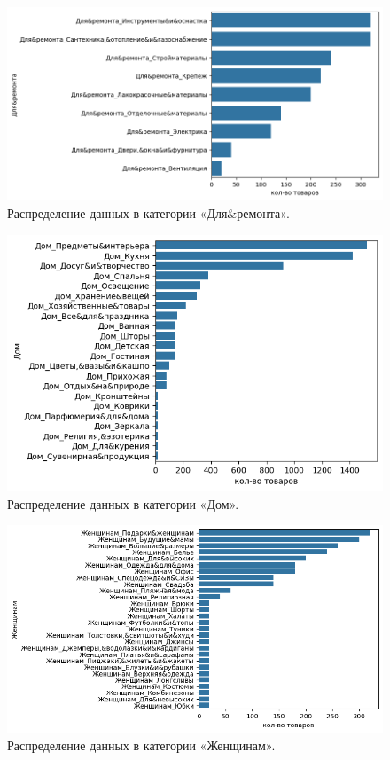 \documentclass[a4paper,12pt]{extarticle}
\begin{document}
\begin{figure}[hbtp]
	\centering
	\includegraphics[scale=0.8]{приложения/amount_of_category_Для&ремонта.png}
	\caption{Распределение данных в категории «Для\&ремонта».}
	\label{fig:amount_of_category_Для&ремонта}
\end{figure}

\begin{figure}[hbtp]
	\centering
	\includegraphics[scale=0.8]{приложения/amount_of_category_Дом.png}
	\caption{Распределение данных в категории «Дом».}
	\label{fig:amount_of_category_Дом}
\end{figure}

\begin{figure}[hbtp]
	\centering
	\includegraphics[scale=0.8]{приложения/amount_of_category_Женщинам.png}
	\caption{Распределение данных в категории «Женщинам».}
	\label{fig:amount_of_category_Женщинам}
\end{figure}
\end{document}
